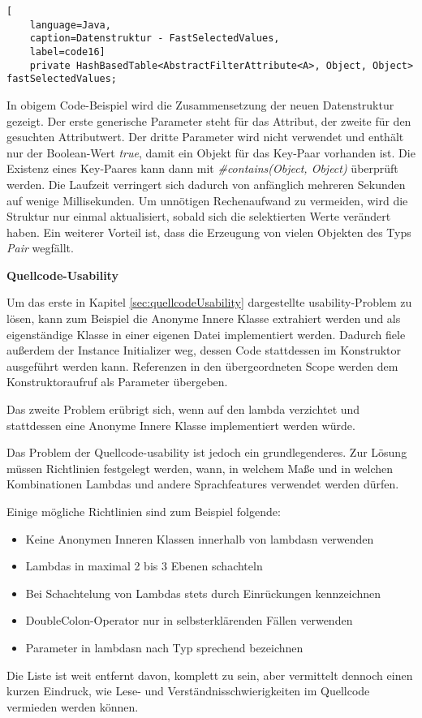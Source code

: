 \begin{lstlisting}[
    language=Java,
    caption=Datenstruktur - FastSelectedValues,
    label=code16]
	private HashBasedTable<AbstractFilterAttribute<A>, Object, Object> fastSelectedValues;
\end{lstlisting}

In obigem Code-Beispiel wird die Zusammensetzung der neuen Datenstruktur gezeigt. Der erste generische Parameter steht für das Attribut, der zweite für den gesuchten Attributwert. Der dritte Parameter wird nicht verwendet und enthält nur der Boolean-Wert \textit{true}, damit ein Objekt für das Key-Paar vorhanden ist. Die Existenz eines Key-Paares kann dann mit \textit{\#contains(Object, Object)} überprüft werden. Die Laufzeit verringert sich dadurch von anfänglich mehreren Sekunden auf wenige Millisekunden. Um unnötigen Rechenaufwand zu vermeiden, wird die Struktur nur einmal aktualisiert, sobald sich die selektierten Werte verändert haben. Ein weiterer Vorteil ist, dass die Erzeugung von vielen Objekten des Typs \textit{Pair} wegfällt.

\textbf{Quellcode-Usability}

Um das erste in Kapitel \ref{sec:quellcodeUsability} dargestellte \gls{usability}-Problem zu lösen, kann zum Beispiel die Anonyme Innere Klasse extrahiert werden und als eigenständige Klasse in einer eigenen Datei implementiert werden. Dadurch fiele außerdem der Instance Initializer weg, dessen Code stattdessen im Konstruktor ausgeführt werden kann. Referenzen in den übergeordneten Scope werden dem Konstruktoraufruf als Parameter übergeben.

Das zweite Problem erübrigt sich, wenn auf den \gls{lambda} verzichtet und stattdessen eine Anonyme Innere Klasse implementiert werden würde.

Das Problem der Quellcode-\gls{usability} ist jedoch ein grundlegenderes. Zur Lösung müssen Richtlinien festgelegt werden, wann, in welchem Maße und in welchen Kombinationen Lambdas und andere Sprachfeatures verwendet werden dürfen.

Einige mögliche Richtlinien sind zum Beispiel folgende:

\begin{itemize}
	\item Keine Anonymen Inneren Klassen innerhalb von \glspl{lambda}n verwenden
	\item Lambdas in maximal 2 bis 3 Ebenen schachteln
	\item Bei Schachtelung von Lambdas stets durch Einrückungen kennzeichnen
	\item DoubleColon-Operator nur in selbsterklärenden Fällen verwenden
	\item Parameter in \glspl{lambda}n nach Typ sprechend bezeichnen
\end{itemize}

Die Liste ist weit entfernt davon, komplett zu sein, aber vermittelt dennoch einen kurzen Eindruck, wie Lese- und Verständnisschwierigkeiten im Quellcode vermieden werden können.